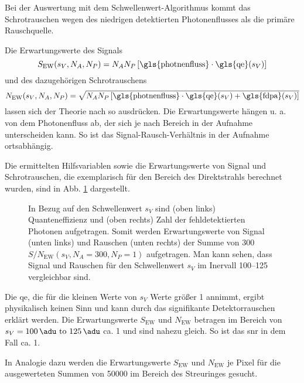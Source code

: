 \noindent
Bei der Auswertung mit dem Schwellenwert-Algorithmus kommt das Schrotrauschen wegen des niedrigen detektierten Photonenflusses als die primäre Rauschquelle.

\noindent
Die Erwartungswerte des Signals 
\begin{equation}
        S_{\text{EW}}(s_V, N_A, N_P) = N_{A}N_{P}\left[\text{\gls{photnenfluss}}\cdot\text{\gls{qe}}(s_V)\right]
        \label{eq:signal_ew}
\end{equation}
und des dazugehörigen Schrotrauschens 
\begin{equation}
        N_{\text{EW}}(s_V, N_A, N_P) = \sqrt{N_{A}N_{P}\left[\text{\gls{photnenfluss}}\cdot\text{\gls{qe}}(s_V) + \text{\gls{fdpa}}(s_V)\right]}
        \label{eq:noise_ew}
\end{equation}
lassen sich der Theorie nach so ausdrücken. Die Erwartungswerte hängen u. a. von dem Photonenfluss ab, der sich je nach Bereich in der Aufnahme unterscheiden kann. So ist das Signal-Rausch-Verhältnis in der Aufnahme ortsabhängig.  

\noindent
Die ermittelten Hilfsvariablen sowie die Erwartungswerte von Signal und Schrotrauschen, die exemplarisch für den Bereich des Direktstrahls berechnet wurden, sind in Abb. \ref{fig:qe_fehldetektiert_signal_noise} dargestellt.
\begin{figure}[H]
    \centering
    
    \caption{In Bezug auf den Schwellenwert $s_V$ sind (oben links) Quanteneffizienz und (oben rechts) Zahl der fehldetektierten Photonen aufgetragen. Somit werden Erwartungswerte von Signal (unten links) und Rauschen (unten rechts) der Summe von \SI{300}{\captures} $S/N_{\text{EW}}(s_V, N_A = 300, N_P = 1)$ aufgetragen. Man kann sehen, dass Signal und Rauschen für den Schwellenwert $s_V$ im Inervall \qtyrange{100}{125}{\adu} vergleichbar sind.}
    \label{fig:qe_fehldetektiert_signal_noise}
\end{figure}
\noindent
Die \gls{qe}, die für die kleinen Werte von $s_V$ Werte größer \num{1} annimmt, ergibt physikalisch keinen Sinn und kann durch das signifikante Detektorrauschen erklärt werden. Die Erwartungswerte $S_{\text{EW}}$ und $N_{\text{EW}}$ betragen im Bereich von $s_V = \text{\SIrange{100}{125}{\adu}}$ ca. \SI{1}{\photon} und sind nahezu gleich. So ist das \gls{snr} in dem Fall ca. 1.

\noindent
In Analogie dazu werden die Erwartungswerte $S_{\text{EW}}$ und $N_{\text{EW}}$ je Pixel für die ausgewerteten Summen von \SI{50000}{\captures} im Bereich des Streuringes gesucht.

